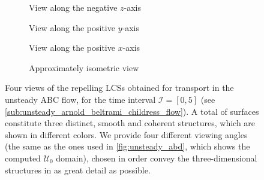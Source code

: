 \begin{figure}[htpb]
    \centering
    \begin{subfigure}[b]{0.475\textwidth}
        \centering
        \caption[]{{\small View along the negative $z$-axis}}
        \label{fig:unsteady_lcss_z}
    \end{subfigure}
    \begin{subfigure}[b]{0.475\textwidth}
        \centering
        \caption[]{{\small View along the positive $y$-axis}}
        \label{fig:unsteady_lcss_y}
    \end{subfigure}

    \begin{subfigure}[b]{0.475\textwidth}
        \centering
        \caption[]{{\small View along the positive $x$-axis}}
        \label{fig:unsteady_lcss_x}
    \end{subfigure}
    \begin{subfigure}[b]{0.475\textwidth}
        \centering
        \caption[]{{\small Approximately isometric view}}
        \label{fig:unsteady_lcss_isometric}
    \end{subfigure}
    \caption[Four views of the repelling LCSs obtained for transport in the
    unsteady ABC flow]
    {
        Four views of the repelling LCSs obtained for transport in the unsteady
        ABC flow, for the time interval $\mathcal{I}=[0,5]$ (see
        \cref{sub:unsteady_arnold_beltrami_childress_flow}). A total of
         surfaces constitute three distinct, smooth and coherent
        structures, which are shown in different colors. We provide four
        different viewing angles (the same as the ones used in
        \cref{fig:unsteady_abd}, which shows the computed $\mathcal{U}_{0}$
        domain), chosen in order convey the three-dimensional structures in as
        great detail as possible.
}
    \label{fig:unsteady_lcss}
\end{figure}

